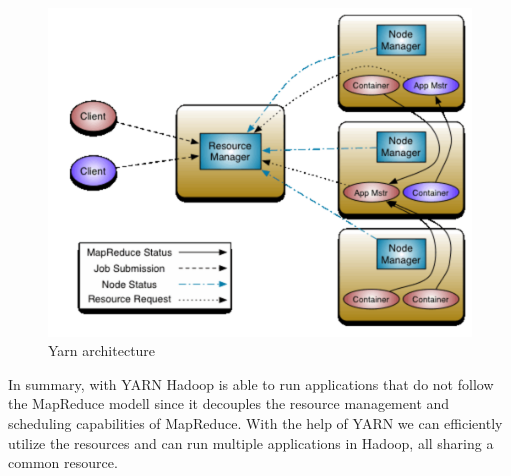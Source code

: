 \begin{figure}[H]
	\includegraphics[width=120mm, keepaspectratio]{figures/yarn.png}
	\centering
	\caption*{Yarn architecture}
	\centering
\end{figure}

In summary, with YARN Hadoop is able to run applications that do not follow the MapReduce modell since it decouples the resource management and scheduling capabilities of MapReduce. With the help of YARN we can efficiently utilize the resources and can run multiple applications in Hadoop, all sharing a common resource.